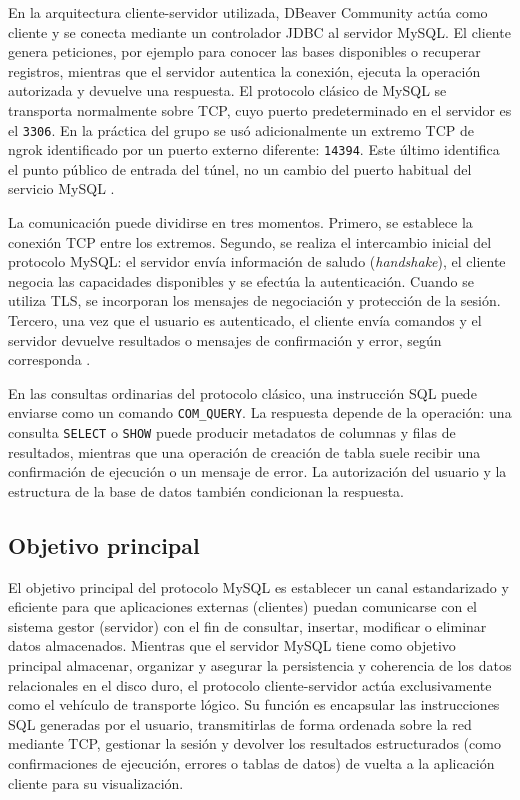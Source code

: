 \documentclass[10pt,a4paper]{article}
\begin{document}
En la arquitectura cliente-servidor utilizada, DBeaver Community actúa como cliente y se conecta mediante un controlador JDBC al servidor MySQL. El cliente genera peticiones, por ejemplo para conocer las bases disponibles o recuperar registros, mientras que el servidor autentica la conexión, ejecuta la operación autorizada y devuelve una respuesta. El protocolo clásico de MySQL se transporta normalmente sobre TCP, cuyo puerto predeterminado en el servidor es el \texttt{3306}. En la práctica del grupo se usó adicionalmente un extremo TCP de ngrok identificado por un puerto externo diferente: \texttt{14394}. Este último identifica el punto público de entrada del túnel, no un cambio del puerto habitual del servicio MySQL \cite{mysqlproto,ngroktcp}.

La comunicación puede dividirse en tres momentos. Primero, se establece la conexión TCP entre los extremos. Segundo, se realiza el intercambio inicial del protocolo MySQL: el servidor envía información de saludo (\emph{handshake}), el cliente negocia las capacidades disponibles y se efectúa la autenticación. Cuando se utiliza TLS, se incorporan los mensajes de negociación y protección de la sesión. Tercero, una vez que el usuario es autenticado, el cliente envía comandos y el servidor devuelve resultados o mensajes de confirmación y error, según corresponda \cite{mysqlproto}.

En las consultas ordinarias del protocolo clásico, una instrucción SQL puede enviarse como un comando \texttt{COM\_QUERY}. La respuesta depende de la operación: una consulta \texttt{SELECT} o \texttt{SHOW} puede producir metadatos de columnas y filas de resultados, mientras que una operación de creación de tabla suele recibir una confirmación de ejecución o un mensaje de error. La autorización del usuario y la estructura de la base de datos también condicionan la respuesta.

\subsection{Objetivo principal}
\label{sub:objetivo}
El objetivo principal del protocolo MySQL es establecer un canal estandarizado y eficiente para que aplicaciones externas (clientes) puedan comunicarse con el sistema gestor (servidor) con el fin de consultar, insertar, modificar o eliminar datos almacenados. Mientras que el servidor MySQL tiene como objetivo principal almacenar, organizar y asegurar la persistencia y coherencia de los datos relacionales en el disco duro, el protocolo cliente-servidor actúa exclusivamente como el vehículo de transporte lógico. Su función es encapsular las instrucciones SQL generadas por el usuario, transmitirlas de forma ordenada sobre la red mediante TCP, gestionar la sesión y devolver los resultados estructurados (como confirmaciones de ejecución, errores o tablas de datos) de vuelta a la aplicación cliente para su visualización.
\end{document}
